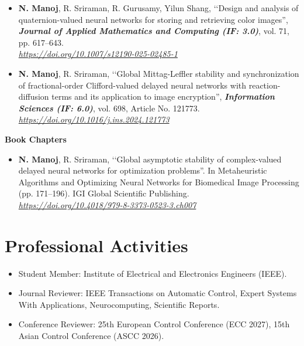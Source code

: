 \documentclass[A4,11pt]{article}
\begin{document}
\begin{itemize}
	\item[2025] {\bf N. Manoj}, R. Sriraman, R. Gurusamy, Yilun Shang, \lq\lq Design and analysis of quaternion-valued neural networks for storing and retrieving color images'', \textbf{\textit{Journal of Applied Mathematics and Computing (IF: 3.0)}}, vol. 71, pp. 617--643.\\ \textit{\url{https://doi.org/10.1007/s12190-025-02485-1}}
	\item[2025]{\bf N. Manoj}, R. Sriraman, \lq\lq Global Mittag-Leffler stability and synchronization of fractional-order Clifford-valued delayed neural networks with reaction-diffusion terms and its application to image encryption'', \textbf{\textit{Information Sciences (IF: 6.0)}}, vol. 698, Article No. 121773.\\ \textit{\url{https://doi.org/10.1016/j.ins.2024.121773}}
\end{itemize}

\textbf{Book Chapters}
\begin{itemize}
	\item[2025] {\bf N. Manoj}, R. Sriraman, \lq\lq Global asymptotic stability of complex-valued delayed neural networks for optimization problems''. In Metaheuristic Algorithms and Optimizing Neural Networks for Biomedical Image Processing (pp. 171--196). IGI Global Scientific Publishing.\\ \textit{\url{https://doi.org/10.4018/979-8-3373-0523-3.ch007}}
\end{itemize}

\section{\textbf{\huge Professional Activities}}
\begin{itemize}
	\item Student Member: Institute of Electrical and Electronics Engineers (IEEE).
	\item Journal Reviewer: IEEE Transactions on Automatic Control, Expert Systems With Applications, Neurocomputing, Scientific Reports.
	\item Conference Reviewer: 25th European Control Conference (ECC 2027), 15th Asian Control Conference (ASCC 2026).
\end{itemize}

\end{document}

